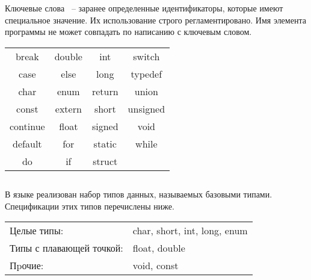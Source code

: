 Ключевые слова ~-- заранее определенные идентификаторы, которые имеют специальное значение. Их использование строго регламентировано. Имя элемента программы не может совпадать по написанию с ключевым словом. 

\begin{center}
\begin{tabular}{ c | c | c | c }
break    & double   & int      & switch \\
case     & else     & long     & typedef \\
char     & enum     & return   & union \\
const    & extern   & short    & unsigned \\
continue & float    & signed   & void \\
default  & for      & static   &  while \\
do       & if       & struct   &  \\
\end{tabular}
\end{center}

\subsection{}

В языке реализован набор типов данных, называемых базовыми типами. Спецификации этих типов перечислены ниже.

\begin{center}
\begin{tabular}{ l l }
Целые типы: & char, short, int, long, enum   \\
Типы с плавающей точкой: & float, double  \\
Пpочие:  & void, const \\
\end{tabular}
\end{center}

